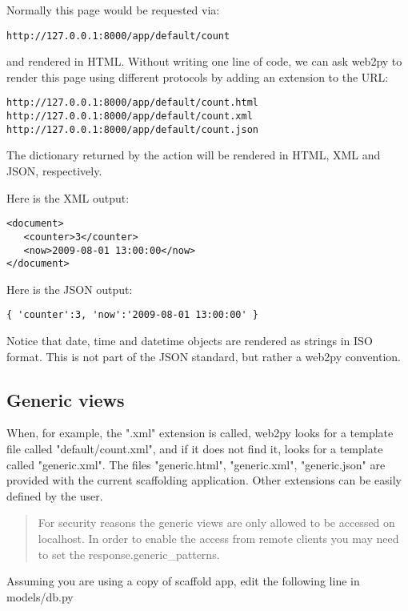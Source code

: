 \documentclass[justified,sixbynine,notoc]{tufte-book}
\begin{document}
\begin{fullwidth}
Normally this page would be requested via:

\begin{lstlisting}[keywords={}]
http://127.0.0.1:8000/app/default/count
\end{lstlisting}
\noindent and rendered in HTML. Without writing one line of code, we can ask web2py to render this page using different protocols by adding an extension to the URL:

\begin{lstlisting}[keywords={}]
http://127.0.0.1:8000/app/default/count.html
http://127.0.0.1:8000/app/default/count.xml
http://127.0.0.1:8000/app/default/count.json
\end{lstlisting}

The dictionary returned by the action will be rendered in HTML, XML and JSON, respectively.

Here is the XML output:
\begin{lstlisting}[keywords={}]
<document>
   <counter>3</counter>
   <now>2009-08-01 13:00:00</now>
</document>
\end{lstlisting}

Here is the JSON output:
\begin{lstlisting}
{ 'counter':3, 'now':'2009-08-01 13:00:00' }
\end{lstlisting}

Notice that date, time and datetime objects are rendered as strings in ISO format. This is not part of the JSON standard, but rather a web2py convention.

\goodbreak\subsection{Generic views}

When, for example, the ".xml" extension is called, web2py looks for a template file called "default/count.xml", and if it does not find it, looks for a template called "generic.xml".  The files "generic.html", "generic.xml", "generic.json" are provided with the current scaffolding application. Other extensions can be easily defined by the user.

\begin{quote}For security reasons the generic views are only allowed to be accessed on localhost. In order to enable the access from remote clients you may need to set the response.generic\_patterns.\end{quote}Assuming you are using a copy of scaffold app, edit the following line in models/db.py


\end{fullwidth}
\end{document}
